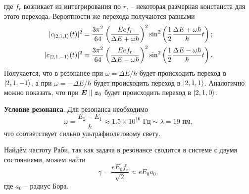 где $f_r$ возникает из интегрирования по $r$, -- некоторая размерная констанста для этого перехода.
Вероятности же перехода получаются равными
\begin{align*}
    |c_{\left| 2,1,1 \right\rangle} (t)|^2 &= 
        \frac{3\pi^2}{64} \left(\frac{E e f_r}{\Delta E + \omega \hbar}\right)^2  \sin^2\left(
            \frac{1}{2} \frac{\Delta E + \omega \hbar}{ \hbar} t
        \right);
    \\
    |c_{\left| 2,1,-1 \right\rangle} (t)|^2 &=  
        \frac{3\pi^2}{64} \left(\frac{E e f_r}{\Delta E - \omega \hbar}\right)^2  \sin^2\left(
            \frac{1}{2} \frac{\Delta E - \omega \hbar}{ \hbar} t
        \right).
    \\
\end{align*}
Получается, что в резонансе при $\omega = \Delta E / \hbar$ будет происходить переход в $\left| 2,1,-1 \right\rangle$, а при $\omega = -\Delta E / \hbar$ будет происходить переход в $\left| 2,1,1 \right\rangle$.
Аналогично можно показать, что при $\mbox{\boldmath $E$} \parallel \mbox{\boldmath $z$}_0$ будет происходить переход в $\left| 2,1,0 \right\rangle$.


\textbf{Условие резонанса}. Для резонанса необходимо
\begin{equation*}
    \omega = \frac{E_2 - E_1}{\hbar} \approx 1.5 \times 10^{16} \text{ Гц} \sim \lambda = 19 \text{ нм},
\end{equation*}
что соответствует сильно ультрафиолетовому свету. 

Найдём частоту Раби, так как задача в резонансе сводится в системе с двумя состояниями, можем найти
\begin{equation*}
    \gamma = \frac{e E_0 f_r}{\sqrt{2}} \approx e E_0 a_0,
\end{equation*}
где $a_0$ -- радиус Бора.







